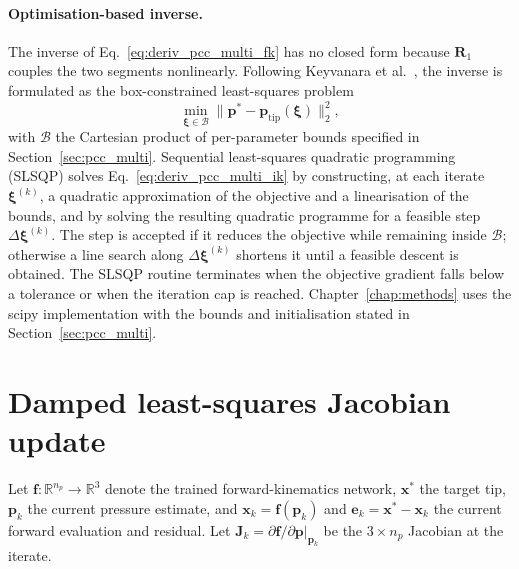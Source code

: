 \paragraph{Optimisation-based inverse.}
The inverse of Eq.~\eqref{eq:deriv_pcc_multi_fk} has no closed form because $\mathbf{R}_{1}$ couples the two segments nonlinearly. Following Keyvanara et al.\ \cite{keyvanara2023geometric}, the inverse is formulated as the box-constrained least-squares problem
\begin{equation}
  \min_{\boldsymbol{\xi} \in \mathcal{B}} \|\mathbf{p}^{*} - \mathbf{p}_{\mathrm{tip}}(\boldsymbol{\xi})\|_{2}^{2},
  \label{eq:deriv_pcc_multi_ik}
\end{equation}
with $\mathcal{B}$ the Cartesian product of per-parameter bounds specified in Section~\ref{sec:pcc_multi}. Sequential least-squares quadratic programming (SLSQP) solves Eq.~\eqref{eq:deriv_pcc_multi_ik} by constructing, at each iterate $\boldsymbol{\xi}^{(k)}$, a quadratic approximation of the objective and a linearisation of the bounds, and by solving the resulting quadratic programme for a feasible step $\Delta \boldsymbol{\xi}^{(k)}$. The step is accepted if it reduces the objective while remaining inside $\mathcal{B}$; otherwise a line search along $\Delta \boldsymbol{\xi}^{(k)}$ shortens it until a feasible descent is obtained. The SLSQP routine terminates when the objective gradient falls below a tolerance or when the iteration cap is reached. Chapter~\ref{chap:methods} uses the scipy implementation with the bounds and initialisation stated in Section~\ref{sec:pcc_multi}.

\section{Damped least-squares Jacobian update}
\label{app:deriv_dls}

Let $\mathbf{f}: \mathbb{R}^{n_{p}} \to \mathbb{R}^{3}$ denote the trained forward-kinematics network, $\mathbf{x}^{*}$ the target tip, $\mathbf{p}_{k}$ the current pressure estimate, and $\mathbf{x}_{k} = \mathbf{f}(\mathbf{p}_{k})$ and $\mathbf{e}_{k} = \mathbf{x}^{*} - \mathbf{x}_{k}$ the current forward evaluation and residual. Let $\mathbf{J}_{k} = \partial \mathbf{f} / \partial \mathbf{p}|_{\mathbf{p}_{k}}$ be the $3 \times n_{p}$ Jacobian at the iterate.

